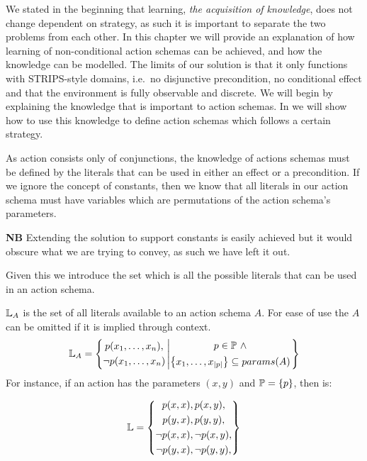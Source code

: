 \documentclass[Master.tex]{subfiles}
\begin{document}
We stated in the beginning that learning, \emph{the acquisition of knowledge}, does not change dependent on strategy, as such it is important to separate the two problems from each other.
In this chapter we will provide an explanation of how learning of non-conditional action schemas can be achieved, and how the knowledge can be modelled.
The limits of our solution is that it only functions with STRIPS-style domains, i.e.\ no disjunctive precondition, no conditional effect and that the environment is fully observable and discrete.
We will begin by explaining the knowledge that is important to action schemas. 
In  we will show how to use this knowledge to define action schemas which follows a certain strategy.

As action consists only of conjunctions, the knowledge of actions schemas must be defined by the literals that can be used in either an effect or a precondition.
If we ignore the concept of constants, then we know that all literals in our action schema must have variables which are permutations of the  action schema's parameters.

\textbf{NB} Extending the solution to support constants is easily achieved but it would obscure what we are trying to convey, as such we have left it out.
 
Given this we introduce the set \lits which is all the possible literals that can be used in an action schema.

\begin{definition} 
	$\mathbb{L}_A$ is the set of all literals available to an action schema $A$. For ease of use the $A$ can be omitted if it is implied through context.
	\begin{equation*}
	\mathbb{L}_A = \left\{ 
	\begin{gathered}
	p(x_1,\dots,x_n), \\
	\neg p(x_1,\dots,x_n)
	\end{gathered}
	\left|
	\begin{gathered} p \in \mathbb{P}~\land \\
	\left\{ x_1,\dots,x_{|p|} \right\} \subseteq params(A)
	\end{gathered}				
	\right.\right\}
	\end{equation*}
	For instance, if an action has the parameters $(x,y)$ and $\mathbb{P} = \{ p \}$, then \lits is:
	
	\begin{equation*}
		\mathbb{L} = \left\{
		\begin{gathered}
			p(x,x), 
			p(x,y), \\
			p(y,x), 
			p(y,y), \\
	\neg	p(x,x), 
	\neg	p(x,y), \\
	\neg	p(y,x), 
	\neg	p(y,y),
		\end{gathered}
		\right\}
	\end{equation*}
	
\end{definition}
\end{document}
